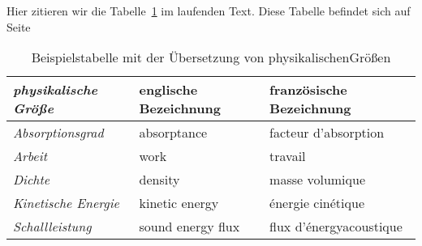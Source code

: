 \documentclass[a4paper, 12pt]{article} %
\begin{document}
Hier zitieren wir die Tabelle~\ref{tab:tabellegleit} im laufenden
Text. Diese Tabelle befindet sich auf
Seite~\pageref{tab:tabellegleit}
\begin{table}[b]
    \begin{tabular}{>{\itshape}lll}
        \hline\hline\bfseries physikalische Größe & 
        \bfseries englische Bezeichnung &
        \bfseries französische Bezeichnung\\\hline
        \hline Absorptionsgrad & absorptance & facteur d’absorption\\
        Arbeit & work & travail\\Dichte & density & masse volumique\\
        Kinetische Energie & kinetic energy & énergie cinétique\\
        Schallleistung & sound energy flux & flux d’énergyacoustique\\\hline
    \end{tabular}%
    \caption{Beispielstabelle mit der Übersetzung von physikalischenGrößen}\label{tab:tabellegleit}
\end{table}
\end{document}

